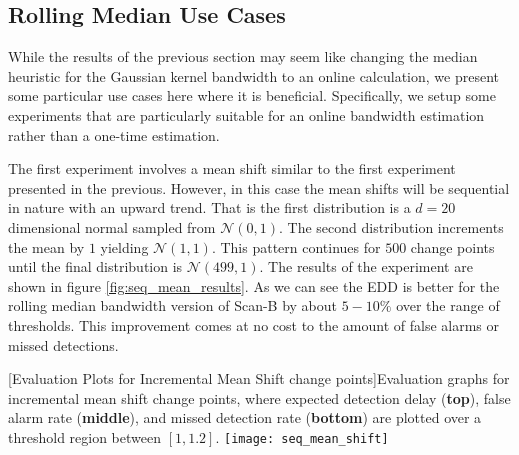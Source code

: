 \subsection{Rolling Median Use Cases}

While the results of the previous section may seem like changing the median heuristic for the Gaussian kernel bandwidth to an online calculation, we present some particular use cases here where it is beneficial. Specifically, we setup some experiments that are particularly suitable for an online bandwidth estimation rather than a one-time estimation.

The first experiment involves a mean shift similar to the first experiment presented in the previous. However, in this case the mean shifts will be sequential in nature with an upward trend. That is the first distribution is a $d=20$ dimensional normal sampled from $\mathcal{N}(0,1)$. The second distribution increments the mean by $1$ yielding $\mathcal{N}(1,1)$. This pattern continues for $500$ change points until the final distribution is $\mathcal{N}(499,1)$. The results of the experiment are shown in figure \ref{fig:seq_mean_results}. As we can see the EDD is better for the rolling median bandwidth version of Scan-B by about $5-10\%$ over the range of thresholds. This improvement comes at no cost to the amount of false alarms or missed detections.

\begin{center} 
[Evaluation Plots for Incremental Mean Shift change points]{Evaluation graphs for incremental mean shift change points, where expected detection delay (\textbf{top}), false alarm rate (\textbf{middle}), and missed detection rate (\textbf{bottom}) are plotted over a threshold region between $[1,1.2]$. } 
\texttt{[image: seq\_mean\_shift]} 
\label{fig:seq_mean_results} 
\end{center}
